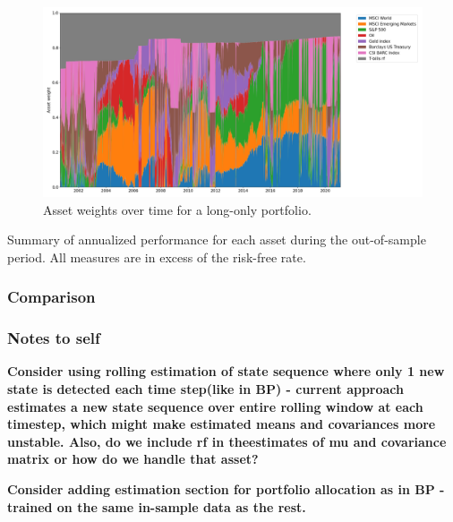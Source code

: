 \begin{figure}[H]
    \centering
    \includegraphics[width=1\textwidth]{analysis/portfolio_exercise/images/port_weights.png}
    \caption{Asset weights over time for a long-only portfolio.}
    \label{fig:MPC_port_weights}
\end{figure}

\begin{table}[H]
\small
\centering
\caption{Summary of annualized performance for each asset during the out-of-sample period. All measures are in excess of the risk-free rate.}

\label{tab:MPC_asset_performance}
\end{table}


\subsubsection{Comparison}



\subsubsection{Notes to self}


\textbf{Consider using rolling estimation of state sequence where only 1 new state is detected each time step(like in BP) - current approach estimates a new state sequence over entire rolling window at each timestep, which might make estimated means and covariances more unstable. Also, do we include rf in theestimates of mu and covariance matrix or how do we handle that asset?}

\textbf{Consider adding estimation section for portfolio allocation as in BP - trained on the same in-sample data as the rest.}
